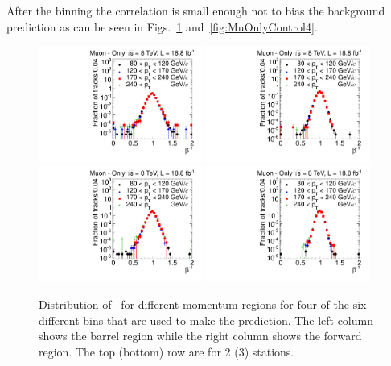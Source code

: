 After the binning the correlation is small enough not to bias the background prediction as can be seen in Figs.~\ref{fig:MuOnlyControl} and~\ref{fig:MuOnlyControl4}.

\begin{figure}
\begin{center}
\includegraphics[clip=false, trim=0.0cm 0cm 0.0cm 0cm, width=0.48\textwidth]{figures/muonly/Control_Data8TeV_Pt_TOFSpectrum_Binned_0}
\includegraphics[clip=false, trim=0.0cm 0cm 0.0cm 0cm, width=0.48\textwidth]{figures/muonly/Control_Data8TeV_Pt_TOFSpectrum_Binned_3} \\
\includegraphics[clip=false, trim=0.0cm 0cm 0.0cm 0cm, width=0.48\textwidth]{figures/muonly/Control_Data8TeV_Pt_TOFSpectrum_Binned_1}
\includegraphics[clip=false, trim=0.0cm 0cm 0.0cm 0cm, width=0.48\textwidth]{figures/muonly/Control_Data8TeV_Pt_TOFSpectrum_Binned_4}
\caption[Distribution of \invbeta\
for different momentum regions for two and three station tracks in the \muononly\ analysis.]
{Distribution of \invbeta\ 
for different momentum regions for four of the six different bins that are used to make the prediction.
The left column shows the barrel region while the right column
shows the forward region.  The top (bottom) row are for 2 (3) stations.}
\label{fig:MuOnlyControl}
\end{center}
\end{figure}

